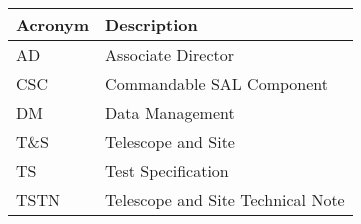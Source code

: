 \addtocounter{table}{-1}
\begin{longtable}{p{}p{}}\hline
\textbf{Acronym} & \textbf{Description}  \\\hline

AD & Associate Director \\\hline
CSC & Commandable SAL Component \\\hline
DM & Data Management \\\hline
T\&S & Telescope and Site \\\hline
TS & Test Specification \\\hline
TSTN & Telescope and Site Technical Note \\\hline
\end{longtable}
